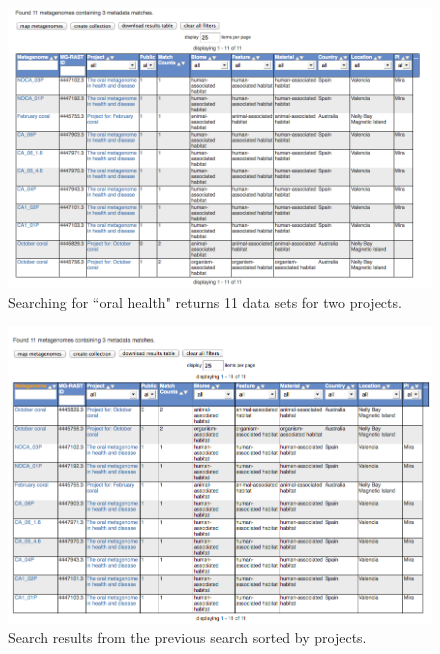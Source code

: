 \documentclass[12pt,fullpage]{report}
\begin{document}
\begin{figure}
\begin{center}
\includegraphics[width=6in]{Images/search-page-unsorted-results.png}
\end{center}
\caption{Searching for ``oral health" returns 11 data sets for two projects. }
\label{fig:search-page-unsorted-results}
\end{figure}


\begin{figure}
\begin{center}
\includegraphics[width=6in]{Images/search-page-sorted-results.png}
\end{center}
\caption{Search results from the previous search sorted by projects.}
\label{fig:search-page-sorted-results}
\end{figure}
\end{document}
